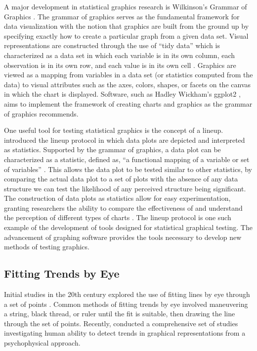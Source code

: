 \documentclass[12pt]{article}
\begin{document}
A major development in statistical graphics research is Wilkinson's
Grammar of Graphics \citep{wilkinson2013grammar}. The grammar of
graphics serves as the fundamental framework for data visualization with
the notion that graphics are built from the ground up by specifying
exactly how to create a particular graph from a given data set. Visual
representations are constructed through the use of ``tidy data'' which
is characterized as a data set in which each variable is in its own
column, each observation is in its own row, and each value is in its own
cell \citep{wickham2016r}. Graphics are viewed as a mapping from
variables in a data set (or statistics computed from the data) to visual
attributes such as the axes, colors, shapes, or facets on the canvas in
which the chart is displayed. Software, such as Hadley Wickham's ggplot2
\citep{wickham2011ggplot2}, aims to implement the framework of creating
charts and graphics as the grammar of graphics recommends.

One useful tool for testing statistical graphics is the concept of a
lineup. \citet{buja2009statistical} introduced the lineup protocol in
which data plots are depicted and interpreted as statistics. Supported
by the grammar of graphics, a data plot can be characterized as a
statistic, defined as, ``a functional mapping of a variable or set of
variables'' \citep{vanderplas2020testing}. This allows the data plot to
be tested similar to other statistics, by comparing the actual data plot
to a set of plots with the absence of any data structure we can test the
likelihood of any perceived structure being significant. The
construction of data plots as statistics allow for easy experimentation,
granting researchers the ability to compare the effectiveness of and
understand the perception of different types of charts
\citep{vanderplas2017clusters, vanderplas2015spatial, hofmann2012graphical}.
The lineup protocol is one such example of the development of tools
designed for statistical graphical testing. The advancement of graphing
software provides the tools necessary to develop new methods of testing
graphics.

\hypertarget{fitting-trends-by-eye}{%
\subsection{Fitting Trends by Eye}\label{fitting-trends-by-eye}}

Initial studies in the 20th century explored the use of fitting lines by
eye through a set of points
\citep{finney1951subjective, mosteller1981eye}. Common methods of
fitting trends by eye involved maneuvering a string, black thread, or
ruler until the fit is suitable, then drawing the line through the set
of points. Recently, \citet{ciccione2021can} conducted a comprehensive
set of studies investigating human ability to detect trends in graphical
representations from a psychophysical approach.
\end{document}
